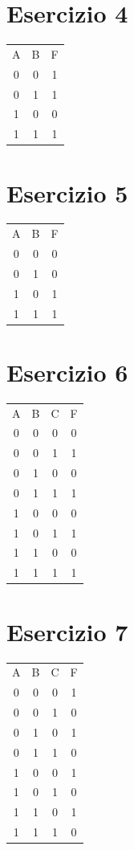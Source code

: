\documentclass[a4paper,12pt]{article}
\begin{document}
	\section*{Esercizio 4}
	
	\begin{tabular}{c c | c}
		A & B & F \\
		0 & 0 & 1 \\
		0 & 1 & 1 \\
		1 & 0 & 0 \\
		1 & 1 & 1 \\
	\end{tabular}
	
	\section*{Esercizio 5}
	
	\begin{tabular}{c c | c}
		A & B & F \\
		0 & 0 & 0 \\
		0 & 1 & 0 \\
		1 & 0 & 1 \\
		1 & 1 & 1 \\
	\end{tabular}
	
	\section*{Esercizio 6}
	
	\begin{tabular}{c c c | c}
		A & B & C & F \\
		0 & 0 & 0 & 0 \\
		0 & 0 & 1 & 1 \\
		0 & 1 & 0 & 0 \\
		0 & 1 & 1 & 1 \\
		1 & 0 & 0 & 0 \\
		1 & 0 & 1 & 1 \\
		1 & 1 & 0 & 0 \\
		1 & 1 & 1 & 1 \\
	\end{tabular}
	
	\section*{Esercizio 7}
	
	\begin{tabular}{c c c | c}
		A & B & C & F \\
		0 & 0 & 0 & 1 \\
		0 & 0 & 1 & 0 \\
		0 & 1 & 0 & 1 \\
		0 & 1 & 1 & 0 \\
		1 & 0 & 0 & 1 \\
		1 & 0 & 1 & 0 \\
		1 & 1 & 0 & 1 \\
		1 & 1 & 1 & 0 \\
	\end{tabular}
	
\end{document}
